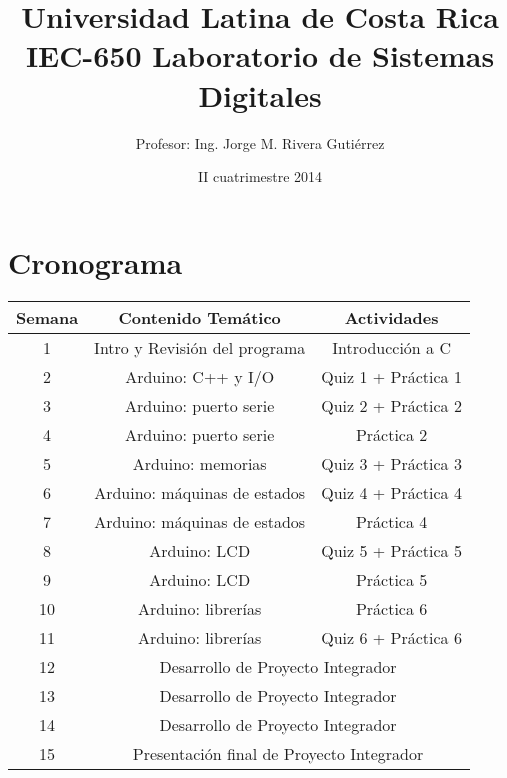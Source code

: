 \documentclass[11pt,letterpaper]{article}
\title{Universidad Latina de Costa Rica\\ IEC-650 Laboratorio de Sistemas Digitales}
\author{Profesor: Ing. Jorge M. Rivera Gutiérrez}
\date{II cuatrimestre 2014}
\begin{document}
\maketitle
\section*{Cronograma}
\begin{center}

  \begin{tabular}{|c|c|c|}\hline

   Semana 	& \multicolumn{1}{c|}{Contenido Temático} & \multicolumn{1}{c|}{Actividades} \\ \hline \hline
   1 		& Intro y Revisión del programa & Introducción a C\\ \hline
   2 		& Arduino: C++ y I/O   		& Quiz 1 + Práctica 1 \\ \hline
   3 		& Arduino: puerto serie		& Quiz 2 + Práctica 2 \\ \hline
   4 		& Arduino: puerto serie		& Práctica 2  \\ \hline
   5		& Arduino: memorias   		& Quiz 3 + Práctica 3  \\ \hline
   6 		& Arduino: máquinas de estados	& Quiz 4 + Práctica 4  \\ \hline
   7 		& Arduino: máquinas de estados	 & Práctica 4 \\ \hline
   8 		& Arduino: LCD					 & Quiz 5 + Práctica 5 \\ \hline
   9 		& Arduino: LCD      		     & Práctica 5 \\ \hline
   10 		& Arduino: librerías			& Práctica 6  \\ \hline
   11		& Arduino: librerías	& Quiz 6 + Práctica 6  \\ \hline
   12 		& \multicolumn{2}{c|}{Desarrollo de Proyecto Integrador}  \\ \hline
   13 		& \multicolumn{2}{c|}{Desarrollo de Proyecto Integrador}  \\ \hline
   14		& \multicolumn{2}{c|}{Desarrollo de Proyecto Integrador}  \\ \hline
   15 		& \multicolumn{2}{c|}{Presentación final de Proyecto Integrador}  \\ \hline
  \end{tabular}

\end{center}
\end{document}
